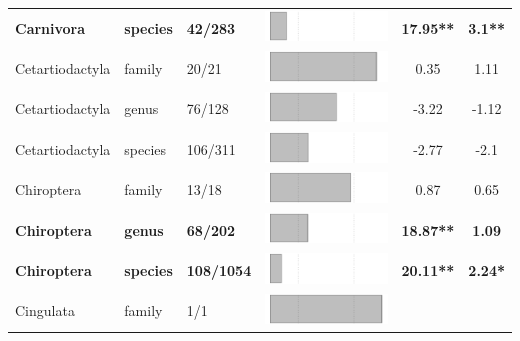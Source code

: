 \begin{longtable}{lL{1.8cm}C{2cm}lcc}
  \textbf{Carnivora} & \textbf{species} & \textbf{42/283} & \includegraphics[width=0.20\linewidth, height=0.05\linewidth]{Table_figures/bar6.pdf} & \textbf{17.95**} & \textbf{3.1**} \\ 
  Cetartiodactyla & family & 20/21 & \includegraphics[width=0.20\linewidth, height=0.05\linewidth]{Table_figures/bar7.pdf} & 0.35 & 1.11 \\ 
  Cetartiodactyla & genus & 76/128 & \includegraphics[width=0.20\linewidth, height=0.05\linewidth]{Table_figures/bar8.pdf} & -3.22 & -1.12 \\ 
  Cetartiodactyla & species & 106/311 & \includegraphics[width=0.20\linewidth, height=0.05\linewidth]{Table_figures/bar9.pdf} & -2.77 & -2.1 \\ 
  Chiroptera & family & 13/18 & \includegraphics[width=0.20\linewidth, height=0.05\linewidth]{Table_figures/bar10.pdf} & 0.87 & 0.65 \\ 
  \textbf{Chiroptera} & \textbf{genus} & \textbf{68/202} & \includegraphics[width=0.20\linewidth, height=0.05\linewidth]{Table_figures/bar11.pdf} & \textbf{18.87**} & \textbf{1.09} \\ 
  \textbf{Chiroptera} & \textbf{species} & \textbf{108/1054} & \includegraphics[width=0.20\linewidth, height=0.05\linewidth]{Table_figures/bar12.pdf} & \textbf{20.11**} & \textbf{2.24*} \\ 
  Cingulata & family & 1/1 & \includegraphics[width=0.20\linewidth, height=0.05\linewidth]{Table_figures/bar13.pdf} &   &   \\ 

\end{longtable}
